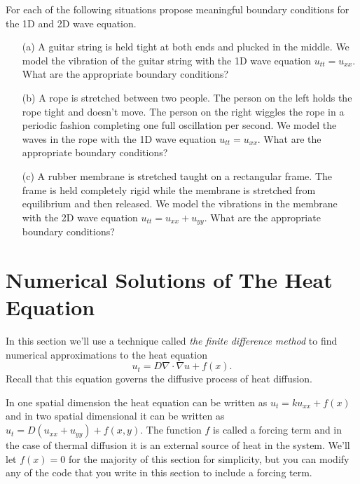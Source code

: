 \begin{problem}\label{prob:wave_bc}
   For each of the following situations propose meaningful boundary conditions for the 1D
   and 2D wave equation.
   \begin{enumerate}
       \item[(a)] A guitar string is held tight at both ends and plucked in the middle.
           We model the vibration of the guitar string with the 1D wave equation $u_{tt} =
           u_{xx}$.  What are the appropriate boundary conditions?
       \item[(b)] A rope is stretched between two people.  The person on the left holds
           the rope tight and doesn't move.  The person on the right wiggles the rope in a
           periodic fashion completing one full oscillation per second.  We model the
           waves in the rope with the 1D wave equation $u_{tt} = u_{xx}$.  What are the
           appropriate boundary conditions?
       \item[(c)] A rubber membrane is stretched taught on a rectangular frame.  The frame is
           held completely rigid while the membrane is stretched from equilibrium and then
           released.  We model the vibrations in the membrane with the 2D wave equation
           $u_{tt} = u_{xx} + u_{yy}$.  What are the appropriate boundary conditions?
   \end{enumerate}
\end{problem}


\newpage\section{Numerical Solutions of The Heat Equation}
In this section we'll use a technique called {\it the finite difference method} to find
numerical approximations to the heat equation
\[ u_t = D \nabla \cdot \nabla u + f(x). \]
Recall that this equation governs the diffusive process of heat diffusion.

In one spatial dimension the heat equation can be written as $u_t = ku_{xx} + f(x)$ and in
two spatial dimensional it can be written as $u_t = D \left( u_{xx} + u_{yy} \right) +
f(x,y)$.  The function $f$ is called a forcing term and in the case of thermal diffusion
it is an external source of heat in the system.  We'll let $f(x) = 0$ for the majority of
this section for simplicity, but you can modify any of the code that you write in this
section to include a forcing term.

